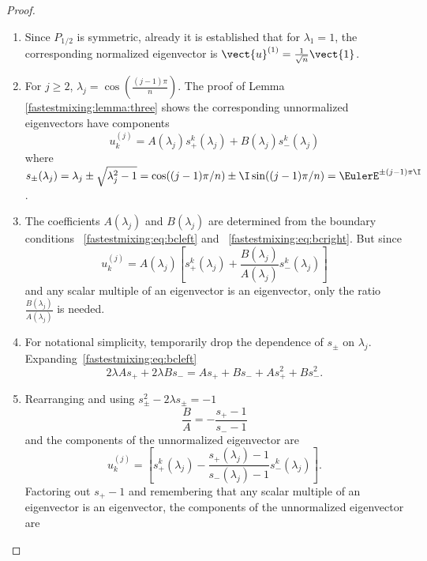 \documentclass[12pt]{article}
\begin{document}
\begin{proof}
    \begin{enumerate}
        \item
            Since \( P_{1/2} \) is symmetric, already it is established
            that for \( \lambda_1 = 1 \), the corresponding normalized
            eigenvector is \( \vect{u}^{(1)} = \frac{1}{\sqrt{n}}\vect{1}
            \).
        \item
            For \( j \ge 2 \), \( \lambda_j = \cos\left( \frac{(j-1) \pi}
            {n} \right) \).  The proof of Lemma~%
            \ref{fastestmixing:lemma:three} shows the corresponding
            unnormalized eigenvectors have components
            \[
                u^{(j)}_k = A(\lambda_j) s_{+}^k(\lambda_j) + B(\lambda_j)s_
                {-}^k(\lambda_j)
            \] where \( s_{\pm}(\lambda_j) = \lambda_j \pm \sqrt{\lambda_j^2
            - 1} = \cos((j-1) \pi/n) \pm \I \sin((j-1) \pi/n) = \EulerE^
            {\pm (j-1) \pi \I} \).
        \item
            The coefficients \( A(\lambda_j) \) and \( B(\lambda_j) \)
            are determined from the boundary conditions~%
            \eqref{fastestmixing:eq:bcleft} and~%
            \eqref{fastestmixing:eq:bcright}.  But since
            \[
                u^{(j)}_k = A(\lambda_j) \left[ s_{+}^k(\lambda_j) +
                \frac{B(\lambda_j)}{A(\lambda_j)}s_{-}^k(\lambda_j)
                \right]
            \] and any scalar multiple of an eigenvector is an
            eigenvector, only the ratio \( \frac{B(\lambda_j)}{A(\lambda_j)}
            \) is needed.
        \item
            For notational simplicity, temporarily drop the dependence
            of \( s_{\pm} \) on \( \lambda_j \).  Expanding~\eqref{fastestmixing:eq:bcleft}
            \[
                2\lambda A s_+ + 2 \lambda B s_{-} = A s_+ + B s_- + A s_+^2
                + B s_-^2.
            \]
        \item
            Rearranging and using \( s_{\pm}^2 - 2\lambda s_{\pm} = -1 \)
            \[
                \frac{B}{A} = - \frac{s_+ - 1}{s_- - 1}
            \] and the components of the unnormalized eigenvector are
            \[
                u_k^{(j)} = \left[ s_+^k(\lambda_j) - \frac{s_+(\lambda_j)
                - 1}{s_-(\lambda_j) - 1} s_-^k(\lambda_j) \right].
            \] Factoring out \( s_+ - 1 \) and remembering that any
            scalar multiple of an eigenvector is an eigenvector, the
            components of the unnormalized eigenvector are

\end{enumerate}
\end{proof}
\end{document}
